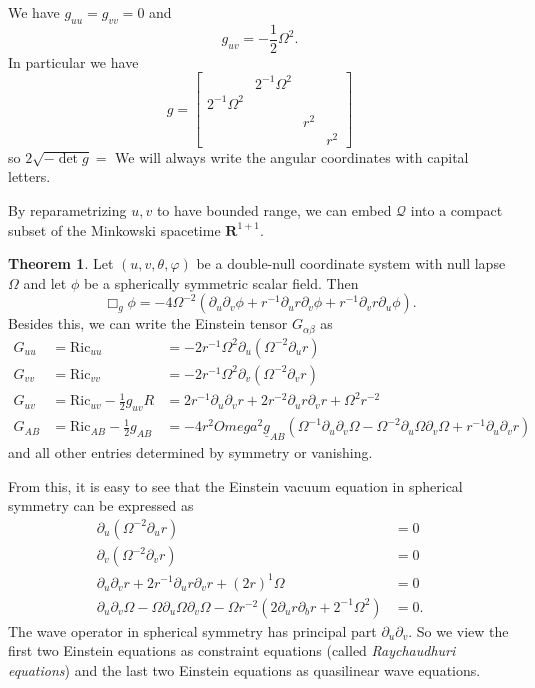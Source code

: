 \documentclass[12pt]{report}
\newcommand{\RR}{\mathbf{R}}
\newcommand{\Ric}{\text{Ric}}
\newcommand{\Q}{\mathcal Q}
\newcommand{\dfn}[1]{\emph{#1}\index{#1}}
\theoremstyle{definition}
\newtheorem{theorem}{Theorem}[chapter]
\theoremstyle{remark}
\begin{document}
    We have $g_{uu} = g_{vv} = 0$ and
    $$g_{uv} = - \frac{1}{2} \Omega^2.$$
In particular we have
$$g = \begin{bmatrix}
&2^{-1}\Omega^2\\
2^{-1}\Omega^2\\
&&r^2\\
&&&r^2\end{bmatrix}$$
so
$2\sqrt{-\det g} = $
    We will always write the angular coordinates with capital letters.
    
    By reparametrizing $u,v$ to have bounded range, we can embed $\Q$ into a compact subset of the Minkowski spacetime $\RR^{1+1}$.
\begin{theorem}
    Let $(u, v, \theta, \varphi)$ be a double-null coordinate system with null lapse $\Omega$ and let $\phi$ be a spherically symmetric scalar field. Then
    $$\Box_g \phi = -4 \Omega^{-2}(\partial_u \partial_v \phi + r^{-1}\partial_u r \partial_v \phi + r^{-1} \partial_v r \partial_u \phi).$$
    Besides this, we can write the Einstein tensor $G_{\alpha\beta}$ as
\begin{align*}
    G_{uu} &= \Ric_{uu} &= -2r^{-1} \Omega^2 \partial_u (\Omega^{-2} \partial_u r)\\
    G_{vv} &= \Ric_{vv} &= -2r^{-1} \Omega^2 \partial_v (\Omega^{-2} \partial_v r)\\
    G_{uv} &= \Ric_{uv} - \frac{1}{2} g_{uv}R &= 2r^{-1} \partial_u \partial_v r + 2r^{-2} \partial_u r \partial_v r + \Omega^2r^{-2}\\
    G_{AB} &= \Ric_{AB} - \frac{1}{2}g_{AB} &= -4r^2 Omega^2\underline g_{AB}(\Omega^{-1} \partial_u \partial_v \Omega - \Omega^{-2} \partial_u \Omega \partial_v \Omega + r^{-1} \partial_u \partial_v r)
\end{align*}
    and all other entries determined by symmetry or vanishing.
\end{theorem}
From this, it is easy to see that the Einstein vacuum equation in spherical symmetry can be expressed as
\begin{align*}
    \partial_u(\Omega^{-2}\partial_u r) &= 0\\
    \partial_v(\Omega^{-2}\partial_v r) &= 0\\
    \partial_u \partial_v r + 2r^{-1} \partial_u r \partial_v r + (2r)^{1} \Omega &= 0\\
    \partial_u \partial_v \Omega - \Omega \partial_u \Omega \partial_v \Omega - \Omega r^{-2}(2\partial_u r \partial_b r + 2^{-1}\Omega^2) &= 0.
\end{align*}
The wave operator in spherical symmetry has principal part $\partial_u \partial_v$. So we view the first two Einstein equations as constraint equations (called \dfn{Raychaudhuri equations}) and the last two Einstein equations as quasilinear wave equations.
\end{document}
